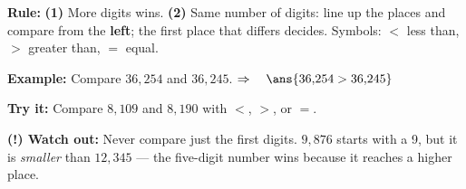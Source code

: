 \documentclass[12pt]{article}
\begin{document}
\begin{formulabox}
\textbf{Rule:} \textbf{(1)} More digits wins. \textbf{(2)} Same number of
digits: line up the places and compare from the \textbf{left}; the first place
that differs decides. Symbols: $<$ less than, $>$ greater than, $=$ equal.
\end{formulabox}

\begin{examplebox}
\textbf{Example:} \quad Compare $36{,}254$ and $36{,}245$.
$\Rightarrow\quad \ans{36{,}254 > 36{,}245}$
\end{examplebox}

\begin{tryitbox}
\textbf{Try it:} \quad Compare $8{,}109$ and $8{,}190$ with $<$, $>$, or $=$.\\[2pt]
\end{tryitbox}

\begin{watchoutbox}
\textbf{(!) Watch out:} Never compare just the first digits. $9{,}876$ starts
with a 9, but it is \emph{smaller} than $12{,}345$ --- the five-digit number
wins because it reaches a higher place.
\end{watchoutbox}
\end{document}
